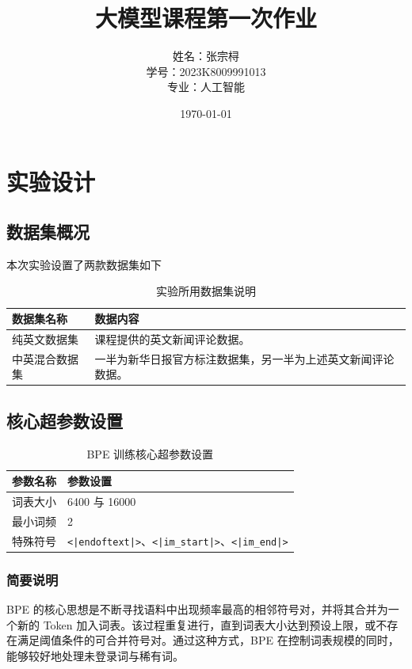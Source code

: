 \documentclass[a4paper,12pt]{ctexart} %
\title{\textbf{大模型课程第一次作业}}
\author{姓名：张宗桪 \\ 学号：2023K8009991013 \\ 专业：人工智能}
\date{\today}
\begin{document}
\pagestyle{plain} %

\maketitle
\thispagestyle{empty} %
\newpage

\tableofcontents
\newpage
\section{实验设计}


\subsection{数据集概况}
本次实验设置了两款数据集如下

\begin{table}[H]
    \centering
    \begin{tabular}{p{} p{}}
        \toprule
        数据集名称 & 数据内容 \\
        \midrule
        纯英文数据集 & 课程提供的英文新闻评论数据。 \\
        中英混合数据集 & 一半为新华日报官方标注数据集，另一半为上述英文新闻评论数据。 \\
        \bottomrule
    \end{tabular}
    \caption{实验所用数据集说明}
\end{table}

\subsection{核心超参数设置}

\begin{table}[H]
    \centering
    \begin{tabular}{p{} p{}}
        \toprule
        参数名称 & 参数设置 \\
        \midrule
        词表大小 & 6400 与 16000 \\
        最小词频 & 2 \\
        特殊符号 & \texttt{<|endoftext|>}、\texttt{<|im\_start|>}、\texttt{<|im\_end|>} \\

        \bottomrule
    \end{tabular}
    \caption{BPE 训练核心超参数设置}
\end{table}


\subsubsection{简要说明}
BPE 的核心思想是不断寻找语料中出现频率最高的相邻符号对，并将其合并为一个新的 Token 加入词表。该过程重复进行，直到词表大小达到预设上限，或不存在满足阈值条件的可合并符号对。通过这种方式，BPE 在控制词表规模的同时，能够较好地处理未登录词与稀有词。
\end{document}
